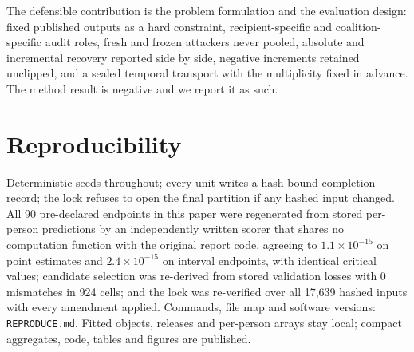 \documentclass[10pt]{article}
\begin{document}
The defensible contribution is the problem formulation and the evaluation design: fixed published
outputs as a hard constraint, recipient-specific and coalition-specific audit roles, fresh and frozen
attackers never pooled, absolute and incremental recovery reported side by side, negative increments
retained unclipped, and a sealed temporal transport with the multiplicity fixed in advance. The
method result is negative and we report it as such.

\section{Reproducibility}
\label{sec:repro}

Deterministic seeds throughout; every unit writes a hash-bound completion record; the lock refuses to
open the final partition if any hashed input changed. All 90 pre-declared endpoints in this paper
were regenerated from stored per-person predictions by an independently written scorer that shares no
computation function with the original report code, agreeing to $1.1\times10^{-15}$ on point
estimates and $2.4\times10^{-15}$ on interval endpoints, with identical critical values; candidate
selection was re-derived from stored validation losses with 0 mismatches in 924 cells; and the lock
was re-verified over all 17{,}639 hashed inputs with every amendment applied. Commands, file map and
software versions: \texttt{REPRODUCE.md}. Fitted objects, releases and per-person arrays stay local;
compact aggregates, code, tables and figures are published.


\end{document}
